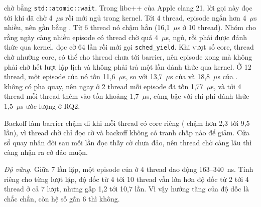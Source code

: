  chờ bằng \texttt{std::atomic::wait}. Trong libc++ của Apple clang 21, lời gọi này đọc
tới khi đã chờ 4~$\mu$s rồi mới ngủ trong kernel. Tới 4 thread, episode ngắn hơn 4~$\mu$s nhiều, nên
 gần bằng . Từ 6 thread nó chậm hẳn (16,1~$\mu$s ở 10 thread). Nhóm cho rằng
ngày càng nhiều episode có thread chờ quá 4~$\mu$s, ngủ, rồi phải được đánh thức qua kernel.
 đọc cờ 64 lần rồi mới gọi \texttt{sched\_yield}. Khi vượt số core, thread chờ nhường
core, có thể cho thread chưa tới barrier, nên episode xong mà không phải chờ hết lượt lập lịch và không
phải trả một lần đánh thức qua kernel. Ở 12 thread, một episode của nó tốn 11,6~$\mu$s, so với 13,7~$\mu$s
của  và 18,8~$\mu$s của .  không có pha quay, nên
ngay ở 2 thread mỗi episode đã tốn 1,77~$\mu$s, và tới 4 thread mỗi thread thêm vào tốn khoảng
1,7~$\mu$s, cùng bậc với chi phí đánh thức 1,5~$\mu$s ước lượng ở RQ2.

Backoff làm barrier chậm đi khi mỗi thread có core riêng ( chậm hơn 
2,3 tới 9,5 lần), vì thread chờ chỉ đọc cờ và backoff không có tranh chấp nào để giảm. Cửa sổ quay nhân
đôi sau mỗi lần đọc thấy cờ chưa đảo, nên thread chờ càng lâu thì càng nhận ra cờ đảo muộn.

\emph{Độ vững.} Giữa 7 lần lặp, một episode của  ở 4 thread dao động 163--340~ns. Tính riêng
cho từng lượt lặp, độ dốc từ 4 tới 10 thread vẫn lớn hơn độ dốc từ 2 tới 4 thread ở cả 7 lượt, nhưng gấp
1,2 tới 10,7 lần. Vì vậy hướng tăng của độ dốc là chắc chắn, còn hệ số gần 6 thì không.
